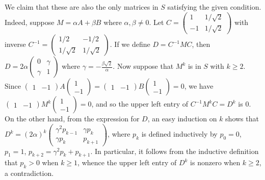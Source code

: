\documentclass[amssymb,twocolumn,pra,10pt,aps]{revtex4-1}
\begin{document}
\begin{itemize}
We claim that these are also the only matrices in $S$ satisfying the given condition. Indeed, suppose $M = \alpha A + \beta B$ where $\alpha,\beta \neq 0$. Let $C = \left( \begin{smallmatrix} 1 & 1/\sqrt{2} \\ -1 & 1/\sqrt{2} \end{smallmatrix} \right)$ with inverse
$C^{-1} = \left( \begin{smallmatrix} 1/2 & -1/2 \\ 1/\sqrt{2} & 1/\sqrt{2} \end{smallmatrix} \right)$. If we define $D = C^{-1}MC$, then $D = 2\alpha \left( \begin{smallmatrix} 0 & \gamma \\ \gamma & 1 \end{smallmatrix} \right)$ where $\gamma = -\frac{\beta\sqrt{2}}{\alpha}$. Now suppose that $M^k$ is in $S$ with $k\geq 2$. Since $\left( \begin{smallmatrix} 1 & -1 \end{smallmatrix} \right) A \left( \begin{smallmatrix} 1 \\ -1 \end{smallmatrix} \right) = \left( \begin{smallmatrix} 1 & -1 \end{smallmatrix} \right) B \left( \begin{smallmatrix} 1 \\ -1 \end{smallmatrix} \right) = 0$,
we have $\left( \begin{smallmatrix} 1 & -1 \end{smallmatrix} \right) M^k \left( \begin{smallmatrix} 1 \\ -1 \end{smallmatrix} \right) = 0$, and so the upper left entry of $C^{-1} M^k C = D^k$ is $0$. On the other hand, from the expression for $D$, an easy induction on $k$ shows that
$D^k = (2\alpha)^k \left( \begin{smallmatrix} \gamma^2 p_{k-1} & \gamma p_k \\
\gamma p_k & p_{k+1} \end{smallmatrix} \right)$, where $p_k$ is defined inductively by $p_0 = 0$, $p_1 = 1$, $p_{k+2} = \gamma^2 p_k + p_{k+1}$. In particular, it follows from the inductive definition that $p_k > 0$ when $k \geq 1$, whence the upper left entry of $D^k$ is nonzero when $k \geq 2$, a contradiction.


\end{itemize}
\end{document}
